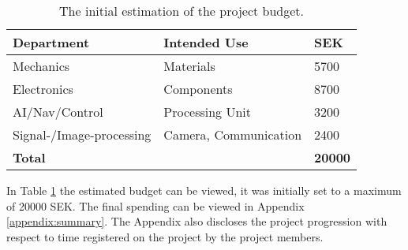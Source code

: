 \begin{table}[ht]
\centering
\begin{tabular}{lll}
\hline
\textbf{Department} & \textbf{Intended Use} & \textbf{SEK} \\ \hline
    Mechanics      &    Materials       &         5700  \\
    Electronics      &      Components     &           8700\\
    AI/Nav/Control      &       Processing Unit    &           3200\\
    Signal-/Image-processing      &     Camera, Communication      &           2400\\
\textbf{Total} & \textbf{} & \textbf{20000} \\ \hline
\end{tabular}
\caption{The initial estimation of the project budget.}
\label{table:budget}
\end{table}

In Table \ref{table:budget} the estimated budget can be viewed, it was initially set to a maximum of 20000 SEK.
The final spending can be viewed in Appendix \ref{appendix:summary}. The Appendix also discloses the project progression with respect to time registered on the project by the project members.
